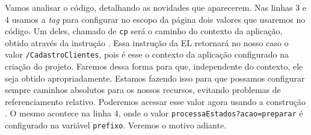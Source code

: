 Vamos analisar o código, detalhando as novidades que aparecerem. Nas linhas 3 e 4 usamos a \textit{tag}  para configurar no escopo da página dois valores que usaremos no código. Um deles, chamado de \texttt{cp} será o caminho do contexto da aplicação, obtido através da instrução . Essa instrução da EL retornará no nosso caso o valor \texttt{/CadastroClientes}, pois é esse o contexto da aplicação configurado na criação do projeto. Faremos dessa forma para que, independente do contexto, ele seja obtido apropriadamente. Estamos fazendo isso para que possamos configurar sempre caminhos absolutos para os nossos recursos, evitando problemas de referenciamento relativo. Poderemos acessar esse valor agora usando a construção . O mesmo acontece na linha 4, onde o valor \texttt{processaEstados?acao=preparar} é configurado na variável \texttt{prefixo}. Veremos o motivo adiante.

